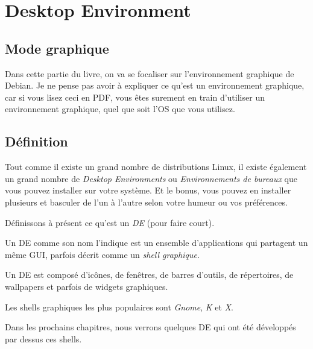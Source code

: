 \chapter{Desktop Environment}

\section{Mode graphique}

Dans cette partie du livre, on va se focaliser sur l'environnement graphique de
Debian. Je ne pense pas avoir à expliquer ce qu'est un environnement graphique,
car si vous lisez ceci en PDF, vous êtes surement en train d'utiliser un
environnement graphique, quel que soit l'OS que vous utilisez.

\section{Définition}

Tout comme il existe un grand nombre de distributions Linux, il existe également
un grand nombre de \emph{Desktop Environments} ou \emph{Environnements de bureaux}
que vous pouvez installer sur votre système. Et le bonus, vous pouvez en installer
plusieurs et basculer de l'un à l'autre selon votre humeur ou vos préférences.

Définissons à présent ce qu'est un \emph{DE} (pour faire court).

Un DE comme son nom l'indique est un ensemble d'applications qui partagent un
même GUI, parfois décrit comme un \emph{shell graphique}.

Un DE est composé d'icônes, de fenêtres, de barres d'outils, de répertoires, de
wallpapers et parfois de widgets graphiques.

Les shells graphiques les plus populaires sont \emph{Gnome}, \emph{K} et \emph{X}.

Dans les prochains chapitres, nous verrons quelques DE qui ont été développés
par dessus ces shells.
